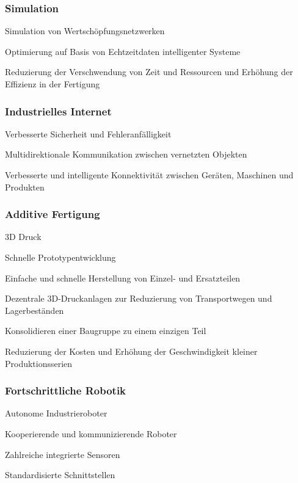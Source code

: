 \subsubsection*{Simulation}
\begin{compactenum}[•]
    \item Simulation von Wertschöpfungsnetzwerken
    \item Optimierung auf Basis von Echtzeitdaten intelligenter Systeme
    \item Reduzierung der Verschwendung von Zeit und Ressourcen und Erhöhung der Effizienz in der Fertigung
\end{compactenum}

\subsubsection*{Industrielles Internet}
\begin{compactenum}[•]
    \item Verbesserte Sicherheit und Fehleranfälligkeit
    \item Multidirektionale Kommunikation zwischen vernetzten Objekten
    \item Verbesserte und intelligente Konnektivität zwischen Geräten, Maschinen und Produkten
\end{compactenum}

\subsubsection*{Additive Fertigung}
\begin{compactenum}[•]
    \item 3D Druck
    \item Schnelle Prototypentwicklung
    \item Einfache und schnelle Herstellung von Einzel- und Ersatzteilen
    \item Dezentrale 3D-Druckanlagen zur Reduzierung von Transportwegen und Lagerbeständen
    \item Konsolidieren einer Baugruppe zu einem einzigen Teil
    \item Reduzierung der Kosten und Erhöhung der Geschwindigkeit kleiner Produktionsserien
\end{compactenum}

\subsubsection*{Fortschrittliche Robotik}
\begin{compactenum}[•]
    \item Autonome Industrieroboter
    \item Kooperierende und kommunizierende Roboter
    \item Zahlreiche integrierte Sensoren
    \item Standardisierte Schnittstellen
\end{compactenum}
\WarningsOn[paralist]

